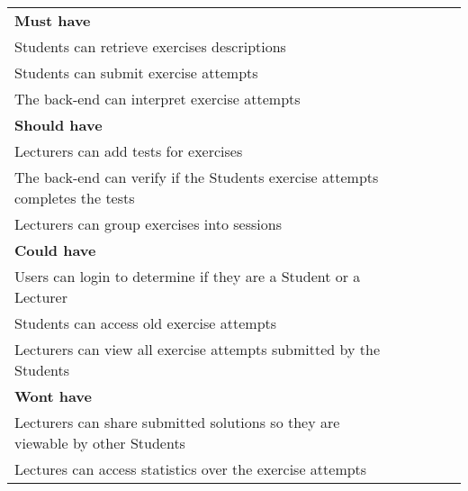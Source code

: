\begin{table}[H]
    \begin{tabular}{|l|llll}
    \cline{1-1}
    \cellcolor[HTML]{C0C0C0}\textbf{Must have}                                      &  &  &  &  \\ \cline{1-1}
    Students can retrieve exercises descriptions                                    &  &  &  &  \\ \cline{1-1}
    Students can submit exercise attempts                                           &  &  &  &  \\ \cline{1-1}
    The back-end can interpret exercise attempts                                    &  &  &  &  \\ \cline{1-1}
    \cellcolor[HTML]{C0C0C0}\textbf{Should have}                                    &  &  &  &  \\ \cline{1-1}
    Lecturers can add tests for exercises                                           &  &  &  &  \\ \cline{1-1}
    The back-end can verify if the Students exercise attempts completes the tests   &  &  &  &  \\ \cline{1-1}
    Lecturers can group exercises into sessions                                     &  &  &  &  \\ \cline{1-1}
    \cellcolor[HTML]{C0C0C0}\textbf{Could have}                                     &  &  &  &  \\ \cline{1-1}
    Users can login to determine if they are a Student or a Lecturer                &  &  &  &  \\ \cline{1-1}
    Students can access old exercise attempts                                       &  &  &  &  \\ \cline{1-1}
    Lecturers can view all exercise attempts submitted by the Students              &  &  &  &  \\ \cline{1-1}
    \cellcolor[HTML]{C0C0C0}\textbf{Wont have}                                      &  &  &  &  \\ \cline{1-1}
    Lecturers can share submitted solutions so they are viewable by other Students  &  &  &  &  \\ \cline{1-1}
    Lectures can access statistics over the exercise attempts                       &  &  &  &  \\ \cline{1-1}
    \end{tabular}
    \end{table}
    
